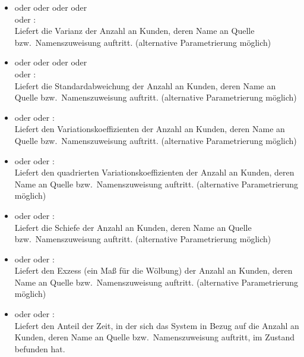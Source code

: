 \begin{itemize}
\item
{} oder  oder  oder  oder\\
 oder :\\
Liefert die Varianz der Anzahl an Kunden, deren Name an Quelle bzw.\ Namenszuweisung  auftritt.
(alternative Parametrierung möglich)

\item
{} oder  oder  oder  oder\\
 oder :\\
Liefert die Standardabweichung der Anzahl an Kunden, deren Name an Quelle bzw.\ Namenszuweisung  auftritt.
(alternative Parametrierung möglich)

\item
{} oder  oder :\\
Liefert den Variationskoeffizienten der Anzahl an Kunden, deren Name an Quelle bzw.\ Namenszuweisung  auftritt.
(alternative Parametrierung möglich)

\item
{} oder  oder :\\
Liefert den quadrierten Variationskoeffizienten der Anzahl an Kunden, deren Name an Quelle bzw.\ Namenszuweisung  auftritt.
(alternative Parametrierung möglich)

\item
{} oder  oder :\\
Liefert die Schiefe der Anzahl an Kunden, deren Name an Quelle bzw.\ Namenszuweisung  auftritt.
(alternative Parametrierung möglich)

\item
{} oder  oder :\\
Liefert den Exzess (ein Maß für die Wölbung) der Anzahl an Kunden, deren Name an Quelle bzw.\ Namenszuweisung  auftritt.
(alternative Parametrierung möglich)

\item
{} oder  oder :\\
Liefert den Anteil der Zeit, in der sich das System in Bezug auf die Anzahl an Kunden, deren Name an Quelle bzw.\ Namenszuweisung  auftritt, im Zustand  befunden hat.


\end{itemize}
